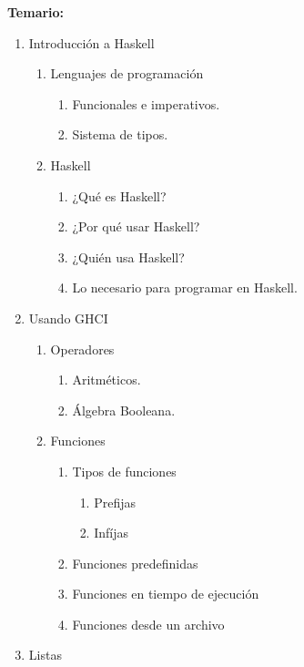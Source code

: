 \documentclass[11pt, letter-paper]{article}
\begin{document}
\noindent\textbf{Temario:}
\begin{enumerate}
    \item Introducción a Haskell
    \begin{enumerate}
    \item Lenguajes de programación
        \begin{enumerate}
            \item Funcionales e imperativos.
            \item Sistema de tipos.
        \end{enumerate}
    \item Haskell
        \begin{enumerate}
            \item ¿Qué es Haskell?
            \item ¿Por qué usar Haskell?
            \item ¿Quién usa Haskell?
            \item Lo necesario para programar en Haskell.
        \end{enumerate}
    \end{enumerate}
    \item Usando GHCI
    \begin{enumerate}
        \item Operadores
        \begin{enumerate}
            \item Aritméticos.
            \item Álgebra Booleana.
        \end{enumerate}
        \item Funciones
        \begin{enumerate}
            \item Tipos de funciones
            \begin{enumerate}
                \item Prefijas
                \item Infíjas
            \end{enumerate}
            \item Funciones predefinidas
            \item Funciones en tiempo de ejecución
            \item Funciones desde un archivo
        \end{enumerate}
    \end{enumerate}
    \item Listas
    \begin{enumerate}

\end{enumerate}
\end{enumerate}
\end{document}
